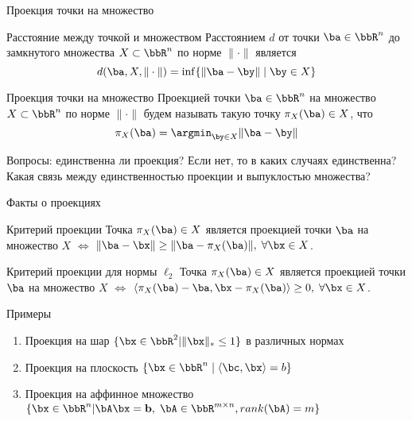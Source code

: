 \documentclass[12pt]{beamer}
\begin{document}
\begin{frame}{Проекция точки на множество}
\small
\begin{block}{Расстояние между точкой и множеством}
Расстоянием $d$ от точки $\ba \in \bbR^n$ до замкнутого множества $X \subset \bbR^n$ по норме $\| \cdot \|$ является
\vspace{-4mm}
\[
d(\ba, X, \| \cdot \|) = \inf\{\| \ba - \by \| \; | \; \by \in X\}
\]
\end{block}
\begin{block}{Проекция точки на множество}
Проекцией точки $\ba \in \bbR^n$ на множество $X \subset \bbR^n$ по норме $\| \cdot \|$ будем называть такую точку $\pi_X(\ba) \in X$, что
\vspace{-4mm}
\[
\pi_X(\ba) = \argmin_{\by \in X} \| \ba - \by \|
\]
\end{block}
Вопросы: единственна ли проекция? Если нет, то в каких случаях единственна? Какая связь между единственностью проекции и выпуклостью множества?

\end{frame}

\begin{frame}{Факты о проекциях}

\begin{block}{Критерий проекции}
Точка $\pi_X(\ba) \in X$ является проекцией точки $\ba$ на множество $X$ $\Leftrightarrow$ $\| \ba - \bx \| \geq \| \ba - \pi_X(\ba) \|, \; \forall \bx \in X$.
\end{block}

\begin{block}{Критерий проекции для нормы $\ell_2$}
Точка $\pi_X(\ba) \in X$ является проекцией точки $\ba$ на множество $X$ $\Leftrightarrow$ $\langle \pi_X(\ba) - \ba, \bx - \pi_X(\ba) \rangle \geq 0, \; \forall \bx \in X$.
\end{block}
\end{frame}

\begin{frame}{Примеры}
\begin{enumerate}
\item Проекция на шар $\{\bx \in \bbR^2 | \| \bx \|_* \leq 1\}$ в различных нормах
\item Проекция на плоскость $\{ \bx \in \bbR^n \; | \; \langle \bc, \bx \rangle = b \}$
\item Проекция на аффинное множество $\{ \bx \in \bbR^n | \bA\bx = \mathbf{b}, \; \bA \in \bbR^{m \times n}, rank(\bA) = m \}$
\end{enumerate}
\end{frame}
\end{document}
